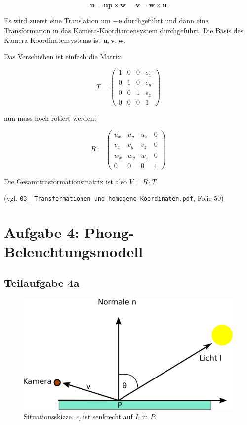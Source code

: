 \documentclass[a4paper]{scrartcl}
\begin{document}
\[\mathbf{u} = \mathbf{up} \times \mathbf{w} \;\;\;\;\; \mathbf{v} = \mathbf{w} \times \mathbf{u}\]

Es wird zuerst eine Translation um $-\mathbf{e}$ durchgeführt und dann
eine Transformation in das Kamera-Koordiantensystem durchgeführt. Die Basis
des Kamera-Koordinatensystems ist $\mathbf{u}, \mathbf{v}, \mathbf{w}$.

Das Verschieben ist einfach die Matrix

\[T = \begin{pmatrix}
1 & 0 & 0 & e_x\\
0 & 1 & 0 & e_y\\
0 & 0 & 1 & e_z\\
0 & 0 & 0 & 1\end{pmatrix}\]

nun muss noch rotiert werden:

\[R = \begin{pmatrix}
u_x & u_y & u_z & 0\\
v_x & v_y & v_z & 0\\
w_x & w_y & w_z & 0\\
0 & 0 & 0 & 1\end{pmatrix}\]

Die Gesamttrasformationsmatrix ist also $V = R \cdot T$.

(vgl. \texttt{03\_ Transformationen und homogene Koordinaten.pdf}, Folie 50)

\section*{Aufgabe 4: Phong-Beleuchtungsmodell}
\subsection*{Teilaufgabe 4a}

\begin{figure}[h]
    \centering
    \includegraphics*[width=0.8\linewidth, keepaspectratio]{reflection-angles.png}
    \caption{Situationsskizze. $r_l$ ist senkrecht auf $L$ in $P$.}
    \label{fig:situation-4a}
\end{figure}
\end{document}
